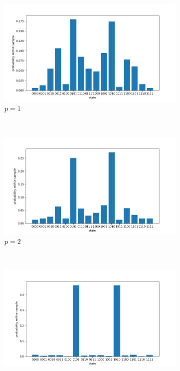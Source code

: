 \begin{figure}[H]
	\centering
	\begin{subfigure}[t]{0.62\textwidth}
		\centering
		\includegraphics[width=\textwidth]{figures/histogram/diamond_p1.png}
		\captionsetup{justification=centering}
		\caption{$p=1$}
	\end{subfigure}
	\\
	\centering
	\begin{subfigure}[t]{0.62\textwidth}
		\centering
		\includegraphics[width=\textwidth]{figures/histogram/diamond_p2.png}
		\captionsetup{justification=centering}
		\caption{$p=2$}
	\end{subfigure}
	\\
	\centering
	\begin{subfigure}[t]{0.62\textwidth}
		\centering
		\includegraphics[width=\textwidth]{figures/histogram/diamond_p3.png}

\end{subfigure}
\end{figure}

